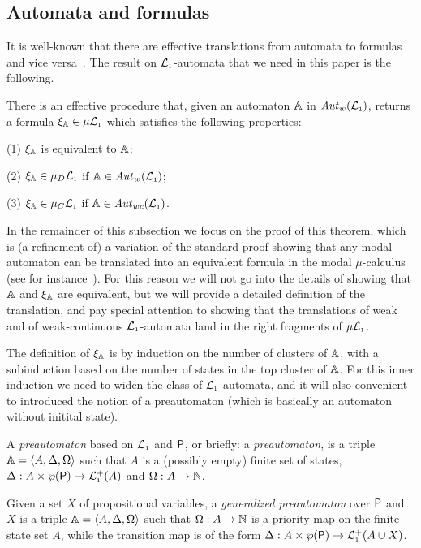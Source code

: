 \subsection{Automata and formulas}

\newcommand{\ytr}{\mathtt{tr}}

It is well-known that there are effective translations from automata to formulas
and vice versa~\cite{xxxx}.
The result on $\mathcal{L}_{\scriptscriptstyle 1}$-automata that we need in this paper is the following.

\begin{theorem}\label{t:autofor}
There is an effective procedure that, given an automaton $\mathbb{A}$ in 
$\mathit{Aut}_{w}(\mathcal{L}_{\scriptscriptstyle 1})$, returns a formula $\xi_{\mathbb{A}} \in \mu\mathcal{L}_{\scriptscriptstyle 1}$ which satisfies
the following properties:

(1) $\xi_{\mathbb{A}}$ is equivalent to $\mathbb{A}$;

(2) $\xi_{\mathbb{A}} \in \mu_{D}\mathcal{L}_{\scriptscriptstyle 1}$ if $\mathbb{A} \in \mathit{Aut}_{w}(\mathcal{L}_{\scriptscriptstyle 1})$;

(3) $\xi_{\mathbb{A}} \in \mu_{C}\mathcal{L}_{\scriptscriptstyle 1}$ if $\mathbb{A} \in \mathit{Aut}_{wc}(\mathcal{L}_{\scriptscriptstyle 1})$.
\end{theorem}

In the remainder of this subsection
we focus on the proof of this theorem, which is (a refinement of)
a variation of the standard proof showing that any modal automaton can be 
translated into an equivalent formula in the modal $\mu$-calculus (see for
instance~\cite[Section 6]{Ven08}). 
For this reason we will not go into the details of showing that $\mathbb{A}$ and 
$\xi_{\mathbb{A}}$ are equivalent, but we will provide a detailed definition of the 
translation, and pay special attention to showing that the translations of weak
and of weak-continuous $\mathcal{L}_{\scriptscriptstyle 1}$-automata land in the right fragments of 
$\mu\mathcal{L}_{\scriptscriptstyle 1}$. 

The definition of $\xi_{\mathbb{A}}$ is by induction on the number of clusters of
$\mathbb{A}$, with a subinduction based on the number of states in the top cluster 
of $\mathbb{A}$.
For this inner induction we need to widen the class of $\mathcal{L}_{\scriptscriptstyle 1}$-automata, and
it will also convenient to introduced the notion of a preautomaton (which is  
basically an automaton without initital state).

\begin{definition}
A \emph{preautomaton} based on $\mathcal{L}_{\scriptscriptstyle 1}$ and $\mathsf{P}$, or briefly: a
\emph{preautomaton}, is a triple $\mathbb{A} = \langle{A,\Delta,\Omega}\rangle$ such that $A$ is
a (possibly empty) finite set of states, $\Delta: A\times \wp(\mathsf{P}) \to 
\mathcal{L}_{\scriptscriptstyle 1}^+(A)$ and $\Omega: A \to \mathbb{N}$.

Given a set $X$ of propositional variables, a \emph{generalized preautomaton} 
over $\mathsf{P}$ and $X$ is a triple $\mathbb{A} = \langle{A,\Delta,\Omega}\rangle$ such that $\Omega:
A \to \mathbb{N}$ is a priority map on the finite state set $A$, while the transition 
map is of the form $\Delta: A\times \wp(\mathsf{P}) \to \mathcal{L}_{\scriptscriptstyle 1}^+(A\cup X)$.
\end{definition}


